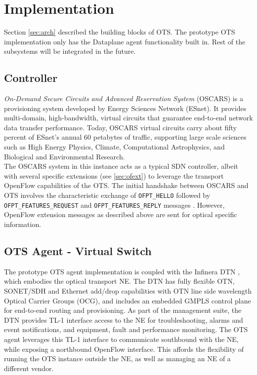 \documentclass{sig-alternate-10pt}
\begin{document}
\section{Implementation}
\label{sec:design}
	Section \ref{sec:arch} described the building blocks of OTS. The prototype OTS implementation only has the 
	Dataplane agent functionality built in. Rest of the subsystems will be integrated in the future. 

	\subsection{Controller}
	\label{sec:oscars}
	\textit{On-Demand Secure Circuits and Advanced Reservation System} (OSCARS) \cite{Guok2008} is a provisioning system developed by Energy Sciences Network (ESnet). 
	It provides multi-domain, high-bandwidth, virtual circuits that guarantee end-to-end network data transfer performance. Today, OSCARS virtual circuits carry about fifty 
	percent of ESnet's annual 60 petabytes of traffic, supporting large scale sciences such as High Energy Physics, Climate, Computational Astrophysics, and Biological and Environmental Research.\\
 
	The OSCARS system in this instance acts as a typical SDN controller, albeit with several specific extensions (see \ref{sec:ofext}) to leverage the transport OpenFlow capabilities 
	of the OTS.  The initial handshake between OSCARS and OTS involves the characteristic exchange of \texttt{OFPT\_HELLO} followed by \texttt{OFPT\_FEATURES\_REQUEST} and 
	\texttt{OFPT\_FEATURES\_REPLY} messages \cite{OF1.0}. However, OpenFlow extension messages as described above are sent for optical specific information.
	
	\subsection{OTS Agent - Virtual Switch}
	\label{sec:otvs}
	
	The prototype OTS agent implementation is coupled with the Infinera DTN \cite{DTN}, which embodies the optical transport NE.  The DTN has fully
	flexible OTN, SONET/SDH and Ethernet add/drop capabilities with OTN \cite{otn} line side wavelength Optical Carrier Groups (OCG), and includes an 
	embedded GMPLS control plane for end-to-end routing and provisioning.  As part of the management suite, the DTN provides TL-1 interface access 
	to the NE for troubleshooting, alarms and event notifications, and equipment, fault and performance monitoring.  The OTS agent leverages this 
	TL-1 interface to communicate southbound with the NE, while exposing a northbound OpenFlow interface.  
	This affords the flexibility of running the OTS instance outside the NE, as well as managing an NE of a different vendor.\\
	
\end{document}
